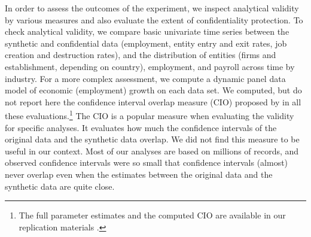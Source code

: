 \documentclass[10pt,twoside]{article}
\begin{document}
In order to assess the outcomes of the experiment, we inspect analytical validity by various measures and also evaluate the extent of confidentiality protection. To check analytical validity, we compare basic univariate time series between the synthetic and confidential data (employment, entity entry and exit rates, job creation and destruction rates), and the distribution of entities (firms and establishment, depending on country),  employment, and payroll across time by industry. For a more complex assessment, we compute a dynamic panel data model of economic (employment) growth on each data set. 
We computed, but do not report here the confidence interval overlap measure (CIO) proposed by \citet{tas2006} in all these evaluations.\footnote{The full parameter estimates and the computed CIO are available in our replication materials \parencite{SIT-paper-repo}.}
The CIO is a popular measure when evaluating the validity for specific analyses. It evaluates how much the confidence intervals of the original data and the synthetic data overlap. We did not find this measure to be useful in our context. Most of our analyses are based on millions of records, and observed confidence intervals were so small that confidence intervals (almost) never overlap even when the estimates between the original data and the synthetic data are quite close. 
\end{document}
